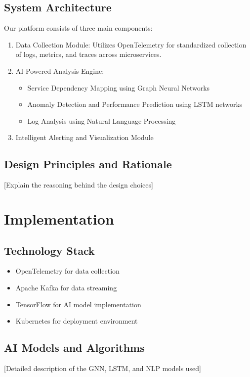 \documentclass[10pt,journal,compsoc]{IEEEtran}
\begin{document}
\subsection{System Architecture}
Our platform consists of three main components:
\begin{enumerate}
    \item Data Collection Module: Utilizes OpenTelemetry for standardized collection of logs, metrics, and traces across microservices.
    \item AI-Powered Analysis Engine:
    \begin{itemize}
        \item Service Dependency Mapping using Graph Neural Networks
        \item Anomaly Detection and Performance Prediction using LSTM networks
        \item Log Analysis using Natural Language Processing
    \end{itemize}
    \item Intelligent Alerting and Visualization Module
\end{enumerate}

\subsection{Design Principles and Rationale}
[Explain the reasoning behind the design choices]

\section{Implementation}
\subsection{Technology Stack}
\begin{itemize}
    \item OpenTelemetry for data collection
    \item Apache Kafka for data streaming
    \item TensorFlow for AI model implementation
    \item Kubernetes for deployment environment
\end{itemize}

\subsection{AI Models and Algorithms}
[Detailed description of the GNN, LSTM, and NLP models used]
\end{document}
